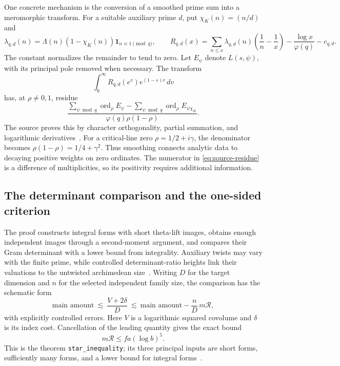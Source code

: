 One concrete mechanism is the conversion of a smoothed prime sum into a
meromorphic transform. For a suitable auxiliary prime \(d\), put
\(\chi_K(n)=(n/d)\) and
\[
 \lambda_{q,d}(n)=\Lambda(n)(1-\chi_K(n))\mathbf1_{n\equiv1\pmod q},
 \qquad
 R_{q,d}(x)=\sum_{n\le x}\lambda_{q,d}(n)
       \left(\frac1n-\frac1x\right)
       -\frac{\log x}{\varphi(q)}-c_{q,d}.
\]
The constant normalizes the remainder to tend to zero. Let \(E_\psi\) denote
\(L(s,\psi)\), with its principal pole removed when necessary. The transform
\[
 \int_0^\infty R_{q,d}(e^v)e^{(1-s)v}\,dv
\]
has, at \(\rho\ne0,1\), residue
\begin{equation}
 \frac{\displaystyle\sum_{\psi\bmod q}\operatorname{ord}_{\rho}E_\psi
       -\displaystyle\sum_{\psi\bmod q}\operatorname{ord}_{\rho}E_{\psi\chi_K}}
      {\varphi(q)\rho(1-\rho)}.
 \label{eq:source-residue}
\end{equation}
The source proves this by character orthogonality, partial summation, and
logarithmic derivatives~\cite{primeerror}.
For a critical-line zero \(\rho=1/2+i\gamma\), the denominator becomes
\(\rho(1-\rho)=1/4+\gamma^2\). Thus smoothing connects analytic data to
decaying positive weights on zero ordinates. The numerator in
\eqref{eq:source-residue} is a difference of multiplicities, so its positivity
requires additional information.

\subsection{The determinant comparison and the one-sided criterion}

The proof constructs integral forms with short theta-lift images, obtains
enough independent images through a second-moment argument, and compares
their Gram determinant with a lower bound from integrality. Auxiliary twists
may vary with the finite prime, while controlled determinant-ratio heights
link their valuations to the untwisted archimedean size~\cite{guide}.
Writing \(D\) for the target dimension and \(n\) for the selected independent
family size, the comparison has the schematic form
\[
 \text{main amount}
 \ \lesssim\ \frac{V+2\delta}{D}
 \ \lesssim\ \text{main amount}-\frac nD\,m\mathcal R,
\]
with explicitly controlled errors. Here \(V\) is a logarithmic squared
covolume and \(\delta\) is its index cost. Cancellation of the leading
quantity gives the exact bound
\begin{equation}
 m\mathcal R\le fa(\log b)^5.
 \label{eq:source-main}
\end{equation}
This is the theorem \texttt{star\_inequality}; its three principal inputs are
short forms, sufficiently many forms, and a lower bound for integral
forms~\cite{mainineq}.

